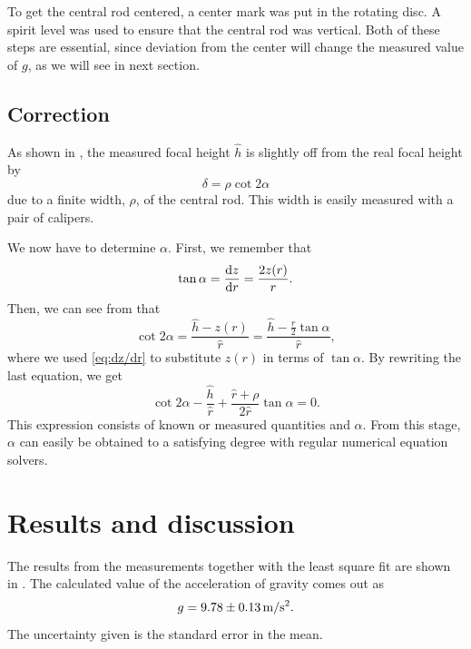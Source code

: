 \documentclass[11pt, a4paper, twocolumn, swedish, english]{article}
\begin{document}
To get the central rod centered, a center mark was put in the rotating
disc. A spirit level was used to ensure that the central rod was
vertical. Both of these steps are essential, since deviation from the
center will change the measured value of $g$, as we will see in next
section. 


\subsection{Correction}\label{sec:corrections}

As shown in , the measured focal height
$\hat{h}$ is slightly off from the real focal height by 
\begin{equation}%
\delta=\rho\cot 2\alpha
\end{equation}
due to a finite width, $\rho$, of the central rod. This width is easily
measured with a pair of calipers.

We now have to determine $\alpha$. First, we remember that
\begin{equation}\label{eq:dz/dr}
\tan\alpha=\dv{z}{r} =\frac{2 z(r)}{r}.
\end{equation}
Then, we can see from  that 
\begin{equation}
\cot 2\alpha =\frac{\hat{h} - z(r)}{\hat{r}} 
= \frac{\hat{h}-\frac{r}{2}\tan\alpha }{\hat{r}},
\end{equation}
where we used \eqref{eq:dz/dr} to substitute $z(r)$ in terms of
$\tan\alpha$. By rewriting the last equation, we get
\begin{equation}
\cot 2\alpha 
-\frac{\hat{h}}{\hat{r}}
+\frac{\hat{r}+\rho}{2\hat{r}}\tan\alpha  = 0.
\end{equation}
This expression consists of known or measured quantities and $\alpha$. From
this stage, $\alpha$ can easily be obtained to a satisfying degree with
regular numerical equation solvers.


\section{Results and discussion}

The results from the measurements together with the least square fit
are shown in . The calculated value of the
acceleration of gravity comes out as
\begin{equation}
g=\unit[9.78\pm 0.13]{m/s^2}.
\end{equation}
The uncertainty given is the standard error in the mean.
\end{document}

